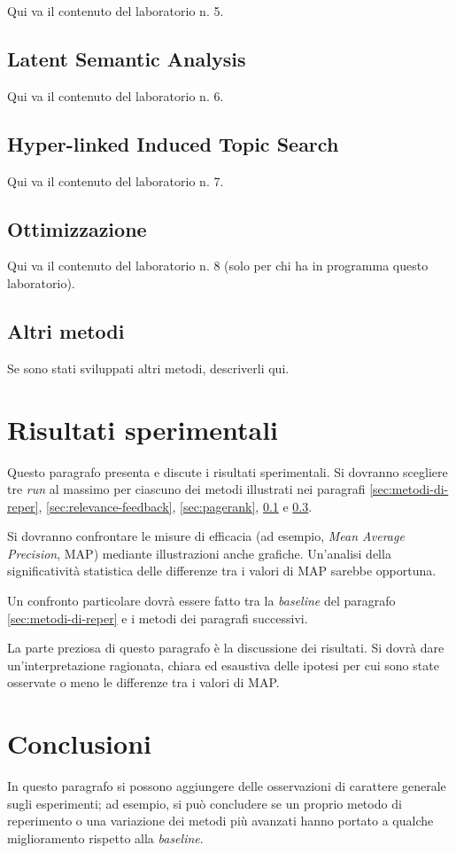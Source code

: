 \documentclass{llncs}
\begin{document}
Qui va il contenuto del laboratorio n. 5.

\subsection{Latent Semantic Analysis}
\label{sec:lsa}

Qui va il contenuto del laboratorio n. 6.

\subsection{Hyper-linked Induced Topic Search}
\label{sec:hits}

Qui va il contenuto del laboratorio n. 7.

\subsection{Ottimizzazione}
\label{sec:hits}

Qui va il contenuto del laboratorio n. 8 (solo per chi ha in programma questo
laboratorio). 

\subsection{Altri metodi}
\label{sec:altri-metodi}

Se sono stati sviluppati altri metodi, descriverli qui.

\section{Risultati sperimentali}
\label{sec:risult-sper}

Questo paragrafo presenta e discute i risultati sperimentali. Si dovranno
scegliere tre \textit{run} al massimo per ciascuno dei metodi illustrati nei
paragrafi \ref{sec:metodi-di-reper}, \ref{sec:relevance-feedback},
\ref{sec:pagerank}, \ref{sec:lsa} e \ref{sec:hits}.  

Si dovranno confrontare le misure di efficacia (ad esempio, \textit{Mean Average
  Precision}, MAP) mediante illustrazioni anche grafiche. Un'analisi della
significativit\`a statistica delle differenze tra i valori di MAP sarebbe
opportuna.

Un confronto particolare dovr\`a essere fatto tra la \textit{baseline} del
paragrafo \ref{sec:metodi-di-reper} e i metodi dei paragrafi successivi.

La parte preziosa di questo paragrafo \`e la discussione dei risultati. Si
dovr\`a dare un'interpretazione ragionata, chiara ed esaustiva delle ipotesi per
cui sono state osservate o meno le differenze tra i valori di MAP. 

\section{Conclusioni}
\label{sec:conclusioni}

In questo paragrafo si possono aggiungere delle osservazioni di carattere
generale sugli esperimenti; ad esempio, si pu\`o concludere se un proprio metodo
di reperimento o una variazione dei metodi pi\`u avanzati hanno portato a
qualche miglioramento rispetto alla \textit{baseline}.
\end{document}
